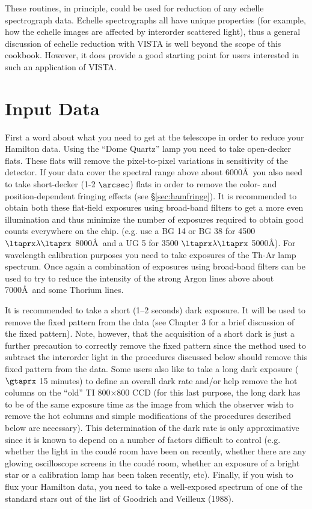 These routines, in principle, could be used for reduction of any echelle
spectrograph data.  Echelle spectrographs all have unique properties (for
example, how the echelle images are affected by interorder scattered light),
thus a general discussion of echelle reduction with VISTA is well beyond the
scope of this cookbook.  However, it does provide a good starting point for
users interested in such an application of VISTA.


\section{Input Data}
\label{sec:haminput}

First a word about what you need to get at the telescope in order to reduce
your Hamilton data.  Using the ``Dome Quartz'' lamp you need to take
open-decker flats.  These flats will remove the pixel-to-pixel variations in
sensitivity of the detector.  If your data cover the spectral range above
about 6000\AA\ you also need to take short-decker (1-2 $\arcsec$) flats in
order to remove the color- and position-dependent fringing effects (see
\S\ref{sec:hamfringe}).  It is recommended to obtain both these flat-field
exposures using broad-band filters to get a more even illumination and thus
minimize the number of exposures required to obtain good counts everywhere on
the chip. (e.g. use a BG 14 or BG 38 for 4500 $\ltaprx \lambda \ltaprx $
8000\AA\ and a UG 5 for 3500 $\ltaprx  \lambda \ltaprx $ 5000\AA). For
wavelength calibration purposes you need to take exposures of the Th-Ar lamp
spectrum. Once again a combination of exposures using broad-band filters can be
used to try to reduce the intensity of the strong Argon lines above about
7000\AA\ and some Thorium lines.

It is recommended to take a short (1--2 seconds) dark exposure. It will be
used to remove the fixed pattern from the data (see Chapter 3 for a brief
discussion of the fixed pattern). Note, however, that the acquisition of a
short dark is just a further precaution to correctly remove the fixed pattern
since the method used to subtract the interorder light in the procedures
discussed below  should remove this fixed pattern from the data. Some users
also like to take a long dark exposure ($\gtaprx$ 15 minutes) to define an
overall dark rate and/or help remove the hot columns on the ``old'' TI
800$\times$800 CCD (for this last purpose, the long dark has to be of the same
exposure time as the image from which the observer wish to remove the hot
columns and simple modifications of the procedures described below are
necessary).  This determination of the dark rate is only approximative since
it is known to depend on a number of factors difficult to control (e.g.
whether the light in the coud\'e room have been on recently, whether there are
any glowing oscilloscope screens in the coud\'e room, whether an exposure of a
bright star or a calibration lamp has been taken recently, etc). Finally, if
you wish to flux your Hamilton data, you need to take a well-exposed spectrum
of one of the standard stars out of the list of Goodrich and Veilleux (1988).

